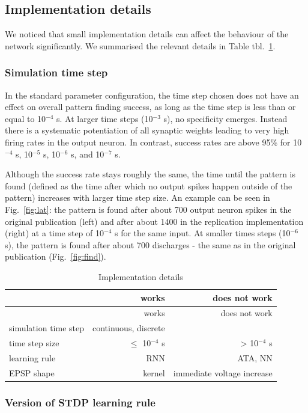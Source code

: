 \documentclass[10pt,a4paper,onecolumn]{article}
\begin{document}
\subsection{Implementation details}\label{implementation-details}

We noticed that small implementation details can affect the behaviour of
the network significantly. We summarised the relevant details in Table
tbl.~\ref{tbl:impl}.

\subsubsection{Simulation time step}\label{simulation-time-step}

In the standard parameter configuration, the time step chosen does not
have an effect on overall pattern finding success, as long as the time
step is less than or equal to 10\(^{-4}\) s. At larger time steps
(10\(^{-3}\) s), no specificity emerges. Instead there is a systematic
potentiation of all synaptic weights leading to very high firing rates
in the output neuron. In contrast, success rates are above 95\% for
10\(^{-4}\) s, 10\(^{-5}\) s, 10\(^{-6}\) s, and 10\(^{-7}\) s.

Although the success rate stays roughly the same, the time until the
pattern is found (defined as the time after which no output spikes
happen outside of the pattern) increases with larger time step size. An
example can be seen in Fig.~\ref{fig:lat}: the pattern is found after
about 700 output neuron spikes in the original publication (left) and
after about 1400 in the replication implementation (right) at a time
step of 10\(^{-4}\) s for the same input. At smaller times steps
(10\(^{-6}\) s), the pattern is found after about 700 discharges - the
same as in the original publication (Fig.~\ref{fig:find}).

\hypertarget{tbl:impl}{}
\begin{longtable}[]{@{}lrr@{}}
\caption{\label{tbl:impl}Implementation details }\tabularnewline
\toprule
& works & does not work\tabularnewline
\midrule
\endfirsthead
\toprule
& works & does not work\tabularnewline
\midrule
\endhead
simulation time step & continuous, discrete &\tabularnewline
time step size & \(\leq\) 10\(^{-4}\) s & \textgreater{} 10\(^{-4}\)
s\tabularnewline
learning rule & RNN & ATA, NN\tabularnewline
EPSP shape & kernel & immediate voltage increase\tabularnewline
\bottomrule
\end{longtable}

\subsubsection{Version of STDP learning
rule}\label{version-of-stdp-learning-rule}
\end{document}
